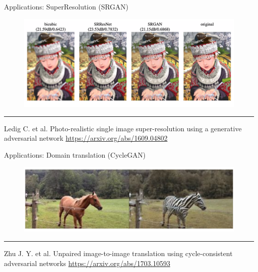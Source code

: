 \documentclass{beamer}
\begin{document}
\begin{frame}{Applications: SuperResolution (SRGAN)}
    \begin{figure}
        \centering
        \includegraphics[width=1.0\linewidth]{figs/srgan.png}
        \label{fig:srgan}
    \end{figure}
\vfill
\hrule\medskip
{\scriptsize Ledig C. et al. Photo-realistic single image super-resolution using a generative adversarial network  \href{https://arxiv.org/abs/1609.04802}{https://arxiv.org/abs/1609.04802}}
\end{frame}
\begin{frame}{Applications: Domain translation (CycleGAN)}
    \begin{figure}
        \centering
        \includegraphics[width=1.0\linewidth]{figs/cyclegan.png}
        \label{fig:cyclegan}
    \end{figure}
\vfill
\hrule\medskip
{\scriptsize Zhu J. Y. et al. Unpaired image-to-image translation using cycle-consistent adversarial networks  \href{https://arxiv.org/abs/1703.10593}{https://arxiv.org/abs/1703.10593}}
\end{frame}
\end{document}
